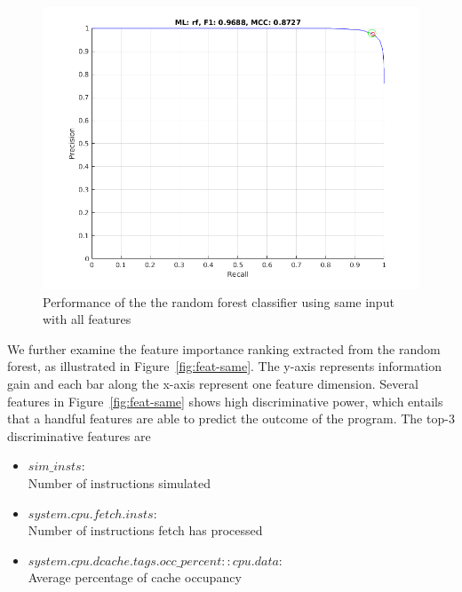 \begin{figure}[ht]
\begin{center}
   \includegraphics[width=0.8\linewidth]{./figures/siaf.png}
\end{center}
   \caption{Performance of the the random forest classifier using same input with all features}
\label{fig:siaf}
\end{figure}

We further examine the feature importance ranking extracted from the random forest, as illustrated in Figure~\ref{fig:feat-same}. The y-axis represents information gain and each bar along the x-axis represent one feature dimension. Several features in Figure~\ref{fig:feat-same} shows high discriminative power, which entails that a handful features are able to predict the outcome of the program. The top-3 discriminative features are 
\begin{itemize}
\item $sim\_insts$: \\
Number of instructions simulated
\item $system.cpu.fetch.insts$: \\
Number of instructions fetch has processed
\item $system.cpu.dcache.tags.occ\_percent::cpu.data$: \\
Average percentage of cache occupancy
\end{itemize}

